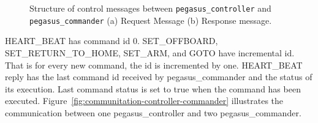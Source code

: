 \begin{figure}
	\centering
	\caption[Structure of control messages.]{\small 
		Structure of control messages between \texttt{pegasus\_controller} and \texttt{pegasus\_commander} (a) Request Message (b) Response message.}
	
	\label{fig:control-messages}
\end{figure}

HEART\_BEAT has command id 0. SET\_OFFBOARD, SET\_RETURN\_TO\_HOME, SET\_ARM, and GOTO have incremental id. That is for every new command, the id is incremented by one. HEART\_BEAT reply has the last command id received by pegasus\_commander and the status of its execution. Last command status is set to true when the command has been executed. Figure~\ref{fig:communitation-controller-commander} illustrates the communication between one pegasus\_controller and two pegasus\_commander.

